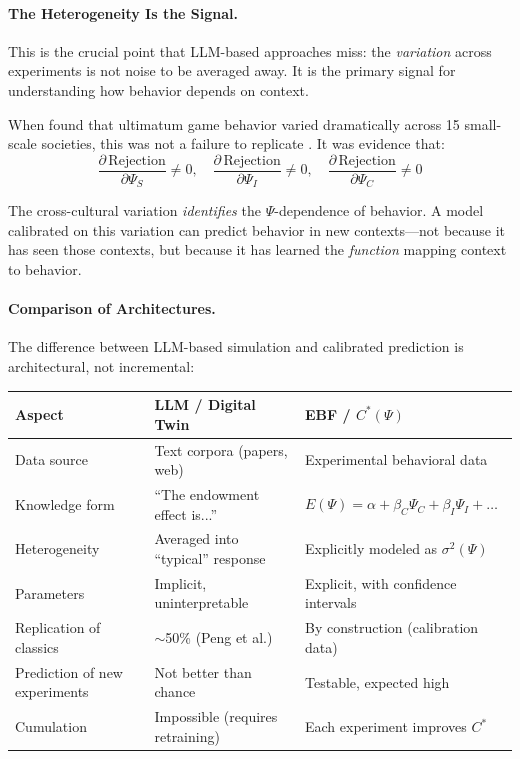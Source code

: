 \paragraph{The Heterogeneity Is the Signal.}
This is the crucial point that LLM-based approaches miss: the
\emph{variation} across experiments is not noise to be averaged away.
It is the primary signal for understanding how behavior depends on context.

When \citet{henrich2001} found that ultimatum game behavior varied
dramatically across 15 small-scale societies, this was not a failure to
replicate \citet{guth1982}. It was evidence that:
\begin{equation}
    \frac{\partial \, \text{Rejection}}{\partial \Psi_S} \neq 0, \quad
    \frac{\partial \, \text{Rejection}}{\partial \Psi_I} \neq 0, \quad
    \frac{\partial \, \text{Rejection}}{\partial \Psi_C} \neq 0
\end{equation}

The cross-cultural variation \emph{identifies} the $\Psi$-dependence of
behavior. A model calibrated on this variation can predict behavior in
new contexts---not because it has seen those contexts, but because it has
learned the \emph{function} mapping context to behavior.

\paragraph{Comparison of Architectures.}
The difference between LLM-based simulation and calibrated prediction is
architectural, not incremental:

\begin{center}
\renewcommand{\arraystretch}{1.4}
\begin{tabular}{p{3.5cm}p{5cm}p{5cm}}
\hline
\textbf{Aspect} & \textbf{LLM / Digital Twin} & \textbf{EBF / $C^*(\Psi)$} \\
\hline
Data source & Text corpora (papers, web) & Experimental behavioral data \\
Knowledge form & ``The endowment effect is...'' & $E(\Psi) = \alpha + \beta_C \Psi_C + \beta_I \Psi_I + \ldots$ \\
Heterogeneity & Averaged into ``typical'' response & Explicitly modeled as $\sigma^2(\Psi)$ \\
Parameters & Implicit, uninterpretable & Explicit, with confidence intervals \\
Replication of classics & $\sim$50\% (Peng et al.) & By construction (calibration data) \\
Prediction of new experiments & Not better than chance & Testable, expected high \\
Cumulation & Impossible (requires retraining) & Each experiment improves $C^*$ \\
\hline
\end{tabular}
\end{center}

